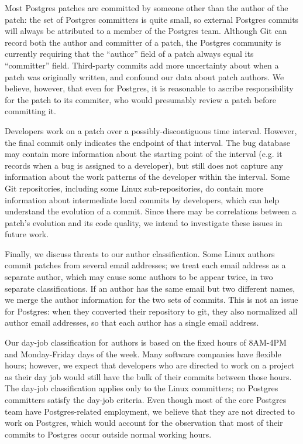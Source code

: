 Most Postgres patches are committed by someone other than the author
of the patch: the set of Postgres committers is quite small, so
external Postgres commits will always be attributed to a member of the
Postgres team. Although Git can record both the author and committer
of a patch, the Postgres community is currently requiring that the
``author'' field of a patch always equal its ``committer'' field.
Third-party commits add more uncertainty about when a patch was
originally written, and confound our data about patch authors.  We
believe, however, that even for Postgres, it is reasonable to ascribe
responsibility for the patch to its commiter, who would presumably
review a patch before committing it. 

Developers work on a patch over a possibly-discontiguous time
interval. However, the final commit only indicates the endpoint of
that interval.  The bug database may contain more information about
the starting point of the interval (e.g. it records when a bug is
assigned to a developer), but still does not capture any information
about the work patterns of the developer within the interval. Some Git
repositories, including some Linux sub-repositories, do contain more
information about intermediate local commits by developers, which can
help understand the evolution of a commit. Since there may be
correlations between a patch's evolution and its code quality, we
intend to investigate these issues in future work.

Finally, we discuss threats to our author classification. Some Linux
authors commit patches from several email addresses; we treat each
email address as a separate author, which may cause some authors to be
appear twice, in two separate classifications. If an author has the
same email but two different names, we merge the author information
for the two sets of commits. This is not an issue for Postgres: when
they converted their repository to git, they also normalized all author
email addresses, so that each author has a single email address.

Our day-job classification for authors is based on the fixed hours of
8AM-4PM and Monday-Friday days of the week.  Many software companies
have flexible hours; however, we expect that developers who are
directed to work on a project as their day job would still have the
bulk of their commits between those hours.  The day-job classification
applies only to the Linux committers; no Postgres committers satisfy
the day-job criteria. Even though most of the core Postgres team have
Postgres-related employment, we believe that they are not directed to
work on Postgres, which would account for the observation that most of
their commits to Postgres occur outside normal working hours.

